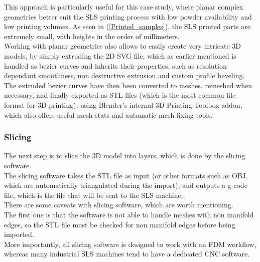 \documentclass{article}
\begin{document}
        This approach is particularly useful for this case study, where planar complex geometries better suit the SLS printing process
        with low powder availability and low printing volumes. As seen in (\ref{Printed_samples}), the SLS printed parts 
        are extremely small, with heights in the order of millimeters. \\
        
        Working with planar geometries also allows to easily create very intricate 3D models, by simply extruding the 2D SVG file, 
        which as earlier mentioned is handled as bezier curves and inherits their properties, such as resolution 
        dependant smoothness, non destructive extrusion and custom profile beveling. \\

        The extruded bezier curves have then been converted to meshes, remeshed when necessary, and finally 
        exported as STL files (which is the most common file format for 3D printing), using 
        Blender's internal 3D Printing Toolbox addon, which also offers useful mesh stats and 
        automatic mesh fixing tools. \\
        
        \subsubsection{Slicing\label{Slicing}}
        
        The next step is to slice the 3D model into layers, which is done by the slicing software. \\

        The slicing software takes the STL file as input (or other formats such as OBJ, which are
        automatically triangulated during the import), and outputs a g-code file, which is the file that will be sent to the SLS machine. \\

        There are some caveats with slicing software, which are worth mentioning. \\

        The first one is that the software is not able to handle meshes with non manifold edges, so 
        the STL file must be checked for non manifold edges before being imported. \\ 

        More importantly, all slicing software is designed to work with an FDM workflow, whereas 
        many industrial SLS machines tend to have a dedicated CNC software. 
\end{document}
